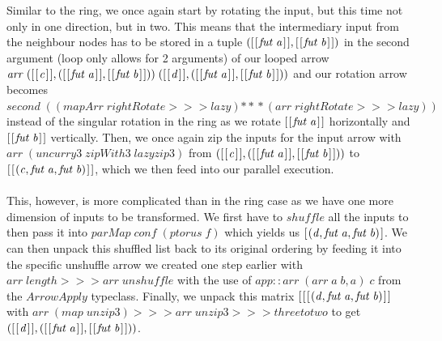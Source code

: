 \documentclass{jfp1}
\newcommand{\Conid}[1]{\mathit{#1}}
\newcommand{\Varid}[1]{\mathit{#1}}
\begin{document}
Similar to the ring, we once again start by rotating the input, but this time not only in one direction, but in two. This means that the intermediary input from the neighbour nodes has to be stored in a tuple \ensuremath{([\mskip1.5mu [\mskip1.5mu \Varid{fut}\;\Varid{a}\mskip1.5mu]\mskip1.5mu],[\mskip1.5mu [\mskip1.5mu \Varid{fut}\;\Varid{b}\mskip1.5mu]\mskip1.5mu])} in the second argument (loop only allows for 2 arguments) of our looped arrow \ensuremath{\Varid{arr}\;([\mskip1.5mu [\mskip1.5mu \Varid{c}\mskip1.5mu]\mskip1.5mu],([\mskip1.5mu [\mskip1.5mu \Varid{fut}\;\Varid{a}\mskip1.5mu]\mskip1.5mu],[\mskip1.5mu [\mskip1.5mu \Varid{fut}\;\Varid{b}\mskip1.5mu]\mskip1.5mu]))\;([\mskip1.5mu [\mskip1.5mu \Varid{d}\mskip1.5mu]\mskip1.5mu],([\mskip1.5mu [\mskip1.5mu \Varid{fut}\;\Varid{a}\mskip1.5mu]\mskip1.5mu],[\mskip1.5mu [\mskip1.5mu \Varid{fut}\;\Varid{b}\mskip1.5mu]\mskip1.5mu]))} and our rotation arrow becomes \ensuremath{\Varid{second}\;((\Varid{mapArr}\;\Varid{rightRotate}\mathbin{>\!\!>\!\!>}\Varid{lazy})\mathbin{*\!*\!*}(\Varid{arr}\;\Varid{rightRotate}\mathbin{>\!\!>\!\!>}\Varid{lazy}))} instead of the singular rotation in the ring as we rotate \ensuremath{[\mskip1.5mu [\mskip1.5mu \Varid{fut}\;\Varid{a}\mskip1.5mu]\mskip1.5mu]} horizontally and \ensuremath{[\mskip1.5mu [\mskip1.5mu \Varid{fut}\;\Varid{b}\mskip1.5mu]\mskip1.5mu]} vertically. Then, we once again zip the inputs for the input arrow with \ensuremath{\Varid{arr}\;(\Varid{uncurry3}\;\Varid{zipWith3}\;\Varid{lazyzip3})} from \ensuremath{([\mskip1.5mu [\mskip1.5mu \Varid{c}\mskip1.5mu]\mskip1.5mu],([\mskip1.5mu [\mskip1.5mu \Varid{fut}\;\Varid{a}\mskip1.5mu]\mskip1.5mu],[\mskip1.5mu [\mskip1.5mu \Varid{fut}\;\Varid{b}\mskip1.5mu]\mskip1.5mu]))} to \ensuremath{[\mskip1.5mu [\mskip1.5mu (\Varid{c},\Varid{fut}\;\Varid{a},\Varid{fut}\;\Varid{b})\mskip1.5mu]\mskip1.5mu]}, which we then feed into our parallel execution.
\\\\
This, however, is more complicated than in the ring case as we have one more dimension of inputs to be transformed. We first have to \ensuremath{\Varid{shuffle}} all the inputs to then pass it into \ensuremath{\Varid{parMap}\;\Varid{conf}\;(\Varid{ptorus}\;\Varid{f})} which yields us \ensuremath{[\mskip1.5mu (\Varid{d},\Varid{fut}\;\Varid{a},\Varid{fut}\;\Varid{b})\mskip1.5mu]}. We can then unpack this shuffled list back to its original ordering by feeding it into the specific unshuffle arrow we created one step earlier with \ensuremath{\Varid{arr}\;\Varid{length}\mathbin{>\!\!>\!\!>}\Varid{arr}\;\Varid{unshuffle}} with the use of \ensuremath{\Varid{app}\mathbin{::}\Varid{arr}\;(\Varid{arr}\;\Varid{a}\;\Varid{b},\Varid{a})\;\Varid{c}} from the \ensuremath{\Conid{ArrowApply}} typeclass. Finally, we unpack this matrix \ensuremath{[\mskip1.5mu [\mskip1.5mu [\mskip1.5mu (\Varid{d},\Varid{fut}\;\Varid{a},\Varid{fut}\;\Varid{b})\mskip1.5mu]\mskip1.5mu]} with \ensuremath{\Varid{arr}\;(\Varid{map}\;\Varid{unzip3})\mathbin{>\!\!>\!\!>}\Varid{arr}\;\Varid{unzip3}\mathbin{>\!\!>\!\!>}\Varid{threetotwo}} to get  \ensuremath{([\mskip1.5mu [\mskip1.5mu \Varid{d}\mskip1.5mu]\mskip1.5mu],([\mskip1.5mu [\mskip1.5mu \Varid{fut}\;\Varid{a}\mskip1.5mu]\mskip1.5mu],[\mskip1.5mu [\mskip1.5mu \Varid{fut}\;\Varid{b}\mskip1.5mu]\mskip1.5mu]))}.
\end{document}
